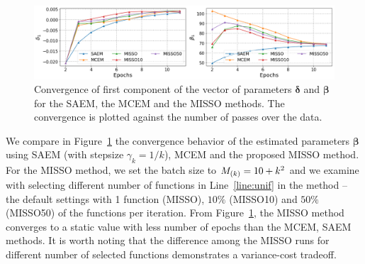 \documentclass[11pt]{article}
\theoremstyle{t}
\begin{document}
\begin{figure}[H]
\includegraphics[width=\textwidth]{pic_paper/traumabasenoexp.png}\vspace{-.2cm}
\caption{Convergence of first component of the vector of parameters ${\bm \delta}$ and ${\bm \beta}$ for the SAEM, the MCEM and the MISSO methods. The convergence is plotted against the number of passes over the data.}\vspace{-.2cm}
\label{fig:misso_trauma}
\end{figure}

We compare in Figure~\ref{fig:misso_trauma} the convergence behavior of the estimated parameters $\bm{\beta}$ using SAEM \citep{delyon1999} (with stepsize $\gamma_k = 1/k$), MCEM \citep{wei1990mcem}  and the proposed MISSO method.
For the MISSO method, we set the batch size to $\Bsize{k} = 10 + k^2$ and we examine with selecting different number of functions in Line~\ref{line:unif} in the method -- the default settings with 1 function (MISSO), $10\%$ (MISSO10) and $50\%$ (MISSO50) of the functions per iteration.
From Figure~\ref{fig:misso_trauma}, the MISSO method converges to a static value with less number of epochs than the MCEM, SAEM methods.
It is worth noting that the difference among the MISSO runs for different number of selected functions demonstrates a variance-cost tradeoff.
\end{document}
